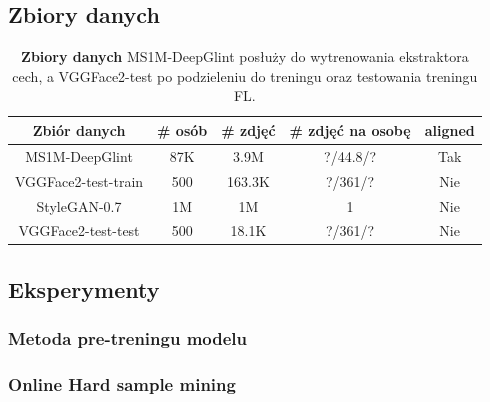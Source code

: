   \subsection{Zbiory danych}
  \begin{table}[H]
  \begin{center}
  \begin{tabular}{ccccc}
  \hline
  Zbiór danych  & \# osób   &   \# zdjęć  &   \# zdjęć na osobę   &   aligned \\
  \hline
  MS1M-DeepGlint \cite{glintweb}   & 87K  & 3.9M & ?/44.8/? & Tak \\
  \hline
  \hline
  VGGFace2-test-train   & 500 & 163.3K & ?/361/? & Nie  \\
  StyleGAN-0.7   & 1M & 1M & 1 & Nie  \\
  \hline
  \hline
  VGGFace2-test-test    & 500 & 18.1K & ?/361/? & Nie  \\
  \hline
  \end{tabular}
  \end{center}
  \caption{\textbf{Zbiory danych} MS1M-DeepGlint posłuży do wytrenowania ekstraktora cech, a VGGFace2-test po podzieleniu do treningu oraz testowania treningu FL.} \label{table:dataset-FL}
  \vspace{-4mm}
  \end{table}


  \subsection{Eksperymenty}
  \subsubsection{Metoda pre-treningu modelu}
  \subsubsection{Online Hard sample mining}